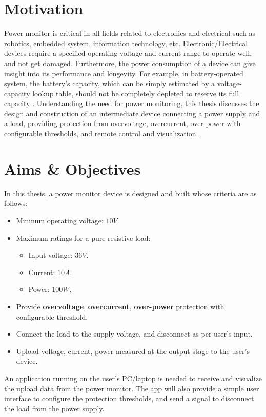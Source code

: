 \documentclass[main.tex]{subfiles}
\begin{document}
    \section{Motivation}
    \justify
    Power monitor is critical in all fields related to electronics and electrical such as robotics, embedded system, information technology, etc. Electronic/Electrical devices require a specified operating voltage and current range to operate well, and not get damaged. Furthermore, the power consumption of a device can give insight into its performance and longevity. For example, in battery-operated system, the battery's capacity, which can be simply estimated by a voltage-capacity lookup table, should not be completely depleted to reserve its full capacity \cite{SATPATHY2021267}. Understanding the need for power monitoring, this thesis discusses the design and construction of an intermediate device connecting a power supply and a load, providing protection from overvoltage, overcurrent, over-power with configurable thresholds, and remote control and visualization.

    \pagebreak
    \section{Aims \& Objectives}
    \justify
    In this thesis, a power monitor device is designed and built whose criteria are as follows:
    \begin{itemize}
        \item Mininum operating voltage: \textbf{$10V$}.
        \item Maximum ratings for a pure resistive load:
        \begin{itemize}
            \item Input voltage: \textbf{$36V$}.
            \item Current: \textbf{$10A$}.
            \item Power: \textbf{$100W$}.
        \end{itemize}
        \item Provide \textbf{overvoltage}, \textbf{overcurrent}, \textbf{over-power} protection with configurable threshold.
        \item Connect the load to the supply voltage, and disconnect as per user's input.
        \item Upload voltage, current, power measured at the output stage to the user's device.
    \end{itemize}

    \justify
    An application running on the user's PC/laptop is needed to receive and visualize the upload data from the power monitor. The app will also provide a simple user interface to configure the protection thresholds, and send a signal to disconnect the load from the power supply.
\end{document}
